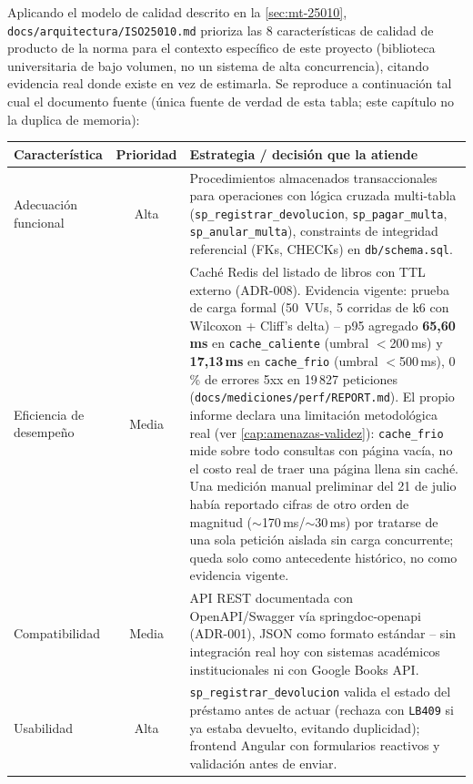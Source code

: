 Aplicando el modelo de calidad descrito en la \autoref{sec:mt-25010},
\texttt{docs/arquitectura/ISO25010.md} prioriza las 8 características de
calidad de producto de la norma para el contexto específico de este
proyecto (biblioteca universitaria de bajo volumen, no un sistema de
alta concurrencia), citando evidencia real donde existe en vez de
estimarla. Se reproduce a continuación tal cual el documento fuente
(única fuente de verdad de esta tabla; este capítulo no la duplica de
memoria):

\begin{center}
\small
\begin{longtable}{|l|c|p{8.7cm}|}
\hline
\rowcolor{verdeuteq}
\color{white}\textbf{Característica} & \color{white}\textbf{Prioridad} & \color{white}\textbf{Estrategia / decisión que la atiende} \\
\hline
\endhead
Adecuación funcional & Alta & Procedimientos almacenados transaccionales para operaciones con lógica cruzada multi-tabla (\texttt{sp\_registrar\_devolucion}, \texttt{sp\_pagar\_multa}, \texttt{sp\_anular\_multa}), constraints de integridad referencial (FKs, CHECKs) en \texttt{db/schema.sql}. \\
\hline
Eficiencia de desempeño & Media & Caché Redis del listado de libros con TTL externo (ADR-008). Evidencia vigente: prueba de carga formal (50~VUs, 5 corridas de k6 con Wilcoxon + Cliff's delta) -- p95 agregado \textbf{65{,}60\,ms} en \texttt{cache\_caliente} (umbral $<$200\,ms) y \textbf{17{,}13\,ms} en \texttt{cache\_frio} (umbral $<$500\,ms), 0\,\% de errores 5xx en 19\,827 peticiones (\texttt{docs/mediciones/perf/REPORT.md}). El propio informe declara una limitación metodológica real (ver \autoref{cap:amenazas-validez}): \texttt{cache\_frio} mide sobre todo consultas con página vacía, no el costo real de traer una página llena sin caché. Una medición manual preliminar del 21 de julio había reportado cifras de otro orden de magnitud ($\sim$170\,ms/$\sim$30\,ms) por tratarse de una sola petición aislada sin carga concurrente; queda solo como antecedente histórico, no como evidencia vigente. \\
\hline
Compatibilidad & Media & API REST documentada con OpenAPI/Swagger vía springdoc-openapi (ADR-001), JSON como formato estándar -- sin integración real hoy con sistemas académicos institucionales ni con Google Books API. \\
\hline
Usabilidad & Alta & \texttt{sp\_registrar\_devolucion} valida el estado del préstamo antes de actuar (rechaza con \texttt{LB409} si ya estaba devuelto, evitando duplicidad); frontend Angular con formularios reactivos y validación antes de enviar. \\

\end{longtable}
\end{center}
